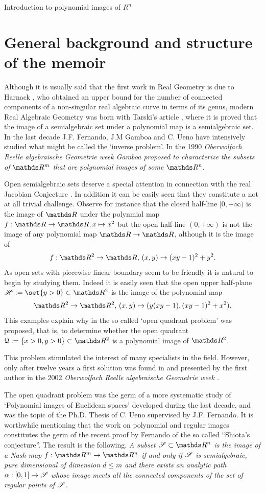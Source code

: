 \documentclass[11pt, a4paper, english, twoside, notitlepage, openright]{report}
\begin{document}
\begin{chapter}{Introduction to polynomial images of $R^n$}

\section{General background and structure of the memoir}

Although it is usually said that the first work in Real Geometry is due to Harnack \cite{h}, who obtained an upper bound for the number of connected components of a non-singular real algebraic curve in terms of its genus, modern Real Algebraic Geometry was born with Tarski's article \cite{ta}, where it is proved that the image of a semialgebraic set under a polynomial map is a semialgebraic set. In the last decade J.F. Fernando, J.M Gamboa and C. Ueno have intensively studied  what might be called the `inverse problem'. In the 1990 \em Oberwolfach Reelle algebraische Geometrie \em week \cite{g} Gamboa proposed to characterize the subsets of $\R^m$ that are polynomial images of some $\R^n$. 

Open semialgebraic sets deserve a special attention in connection with the real Jacobian Conjecture \cite{p}. In addition it can be easily seen that they constitute a not at all trivial challenge. Observe for instance that the closed half-line $[0,+\infty)$ is the image of $\R$ under the polynmial map $f:\R\to\R, x\mapsto x^2$ but the open half-line $(0,+\infty)$ is not the image of any polynomial map $\R\to\R$, although it is the image of 
$$
f:\R^2\to\R,\, (x,y)\to (xy-1)^2+y^2.
$$ 
As open sets with piecewise linear boundary seem to be friendly it is natural to begin by studying them. Indeed it is easily seen that the open upper half-plane $\H:=\set{y>0}\subset\R^2$ is the image of the polynomial map 
$$
\R^2\to\R^2,\, (x,y)\mapsto (y(xy-1),(xy-1)^2+x^2).
$$
This examples explain why in \cite{g} the so called `open quadrant problem' was proposed, that is, to determine whether the open quadrant $\Qu:=\{x>0,y>0\}\subset\R^2$ is a polynomial image of $\R^2$.

This problem stimulated the interest of many specialists in the field. However, only after twelve years a first solution was found in \cite{fg} and presented by the first author in the 2002 \em Oberwolfach Reelle algebraische Geometrie \em week \cite{fe}.

The open quadrant problem was the germ of a more systematic study of `Polynomial images of Euclidean spaces' developed  during the last decade, and was the topic of the Ph.D. Thesis of C. Ueno \cite{u} supervised by J.F. Fernando. It is worthwhile mentioning that the work on polynomial and regular images constitutes the germ of the recent proof by Fernando of the so called ``Shiota's conjecture''. The result is the following.  \em A subset $\Ss\subset\R^n$ is the image of a Nash map $f:\R^m\to\R^n$ if and only if $\mathscr{S}$ is semialgebraic, pure dimensional of dimension $d\leq m$ and there exists an analytic path $\alpha:[0,1]\to\mathscr{S}$ whose image meets all the connected components of the set of regular points of $\mathscr{S}$\em. 


\end{chapter}
\end{document}

